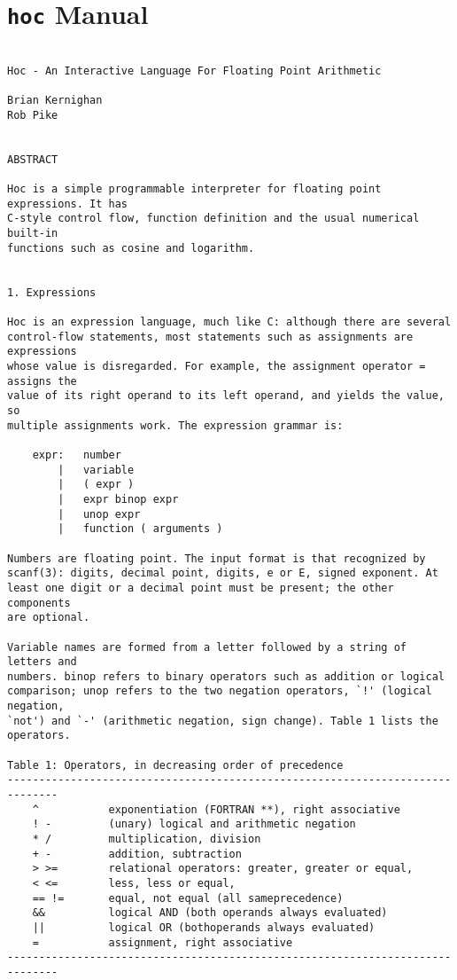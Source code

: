 \chapter{\texttt{hoc} Manual}
\label{chap:hoc_manual}

\begin{verbatim}

Hoc - An Interactive Language For Floating Point Arithmetic

Brian Kernighan
Rob Pike


ABSTRACT

Hoc is a simple programmable interpreter for floating point expressions. It has
C-style control flow, function definition and the usual numerical built-in
functions such as cosine and logarithm.


1. Expressions

Hoc is an expression language, much like C: although there are several
control-flow statements, most statements such as assignments are expressions
whose value is disregarded. For example, the assignment operator = assigns the
value of its right operand to its left operand, and yields the value, so
multiple assignments work. The expression grammar is:

    expr:   number
        |   variable
        |   ( expr )
        |   expr binop expr
        |   unop expr
        |   function ( arguments )
        
Numbers are floating point. The input format is that recognized by
scanf(3): digits, decimal point, digits, e or E, signed exponent. At
least one digit or a decimal point must be present; the other components
are optional.

Variable names are formed from a letter followed by a string of letters and
numbers. binop refers to binary operators such as addition or logical
comparison; unop refers to the two negation operators, `!' (logical negation,
`not') and `-' (arithmetic negation, sign change). Table 1 lists the operators.

Table 1: Operators, in decreasing order of precedence
------------------------------------------------------------------------------
    ^           exponentiation (FORTRAN **), right associative 
    ! -         (unary) logical and arithmetic negation
    * /         multiplication, division 
    + -         addition, subtraction 
    > >=        relational operators: greater, greater or equal,
    < <=        less, less or equal,
    == !=       equal, not equal (all sameprecedence) 
    &&          logical AND (both operands always evaluated) 
    ||          logical OR (bothoperands always evaluated) 
    =           assignment, right associative
------------------------------------------------------------------------------


\end{verbatim}
